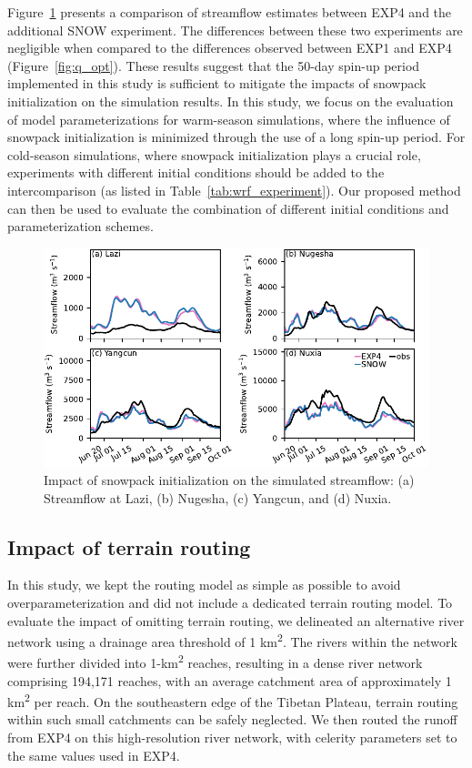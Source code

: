 \documentclass[draft]{agujournal2019}
\begin{document}
Figure~\ref{fig:snow} presents a comparison of streamflow estimates between EXP4 and the additional SNOW experiment. The differences between these two experiments are negligible when compared to the differences observed between EXP1 and EXP4 (Figure~\ref{fig:q_opt}). These results suggest that the 50-day spin-up period implemented in this study is sufficient to mitigate the impacts of snowpack initialization on the simulation results. In this study, we focus on the evaluation of model parameterizations for warm-season simulations, where the influence of snowpack initialization is minimized through the use of a long spin-up period. For cold-season simulations, where snowpack initialization plays a crucial role, experiments with different initial conditions should be added to the intercomparison (as listed in Table~\ref{tab:wrf_experiment}). Our proposed method can then be used to evaluate the combination of different initial conditions and parameterization schemes.

\begin{figure}[h!]
  \centering
  \noindent\includegraphics[width=140mm]{q_snow.pdf}
  \caption{Impact of snowpack initialization on the simulated streamflow: (a) Streamflow at Lazi, (b) Nugesha, (c) Yangcun, and (d) Nuxia.}\label{fig:snow}
\end{figure}

\subsection{Impact of terrain routing}

In this study, we kept the routing model as simple as possible to avoid overparameterization and did not include a dedicated terrain routing model. To evaluate the impact of omitting terrain routing, we delineated an alternative river network using a drainage area threshold of 1 km\textsuperscript{2}. The rivers within the network were further divided into 1-km\textsuperscript{2} reaches, resulting in a dense river network comprising 194,171 reaches, with an average catchment area of approximately 1 km\textsuperscript{2} per reach. On the southeastern edge of the Tibetan Plateau, terrain routing within such small catchments can be safely neglected. We then routed the runoff from EXP4 on this high-resolution river network, with celerity parameters set to the same values used in EXP4.
\end{document}
